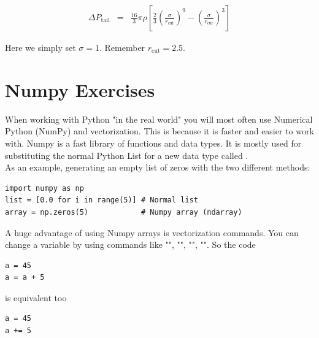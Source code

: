\documentclass{article}
\begin{document}
\begin{eqnarray}
    \Delta P_\mathrm{tail} & = & \frac{16}{3}\pi \rho \left[ \frac{2}{3}\left( \frac{\sigma}{r_{\mathrm{cut}}} \right)^9 - \left(\frac{\sigma}{r_{\mathrm{cut}}} \right)^3 \right]
\end{eqnarray}

Here we simply set $\sigma = 1$. Remember $r_{\mathrm{cut}} = 2.5$.

\newpage


\section{Numpy Exercises}






When working with Python "in the real world" you will most often use Numerical Python (NumPy) and vectorization.
This is because it is faster and easier to work with.
Numpy is a fast library of functions and data types.
It is mostly used for substituting the normal Python List for a new data type called .\\

As an example, generating an empty list of zeros with the two different methods:

\begin{lstlisting}
import numpy as np
list = [0.0 for i in range(5)] # Normal list
array = np.zeros(5)            # Numpy array (ndarray)
\end{lstlisting}

A huge advantage of using Numpy arrays is vectorization commands.
You can change a variable by using commands like
"\code{+=}",
"\code{-=}",
"\code{*=}",
"\code{/=}". So the code

\begin{lstlisting}
a = 45
a = a + 5
\end{lstlisting}

is equivalent too

\begin{lstlisting}
a = 45
a += 5
\end{lstlisting}
\end{document}
